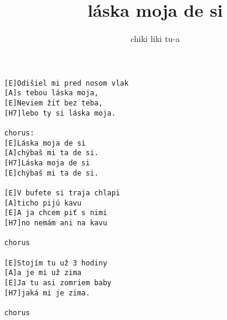 \author{chiki liki tu-a}
\title{láska moja de si}
\maketitle
\begin{verbatim}
[E]Odišiel mi pred nosom vlak
[A]s tebou láska moja,
[E]Neviem žiť bez teba,
[H7]lebo ty si láska moja.

chorus:
[E]Láska moja de si
[A]chýbaš mi ta de si.
[H7]Láska moja de si
[E]chýbaš mi ta de si.

[E]V bufete si traja chlapi
[A]ticho pijú kavu
[E]A ja chcem piť s nimi
[H7]no nemám ani na kavu

chorus

[E]Stojím tu už 3 hodiny
[A]a je mi už zima
[E]Ja tu asi zomriem baby
[H7]jaká mi je zima.

chorus
\end{verbatim}